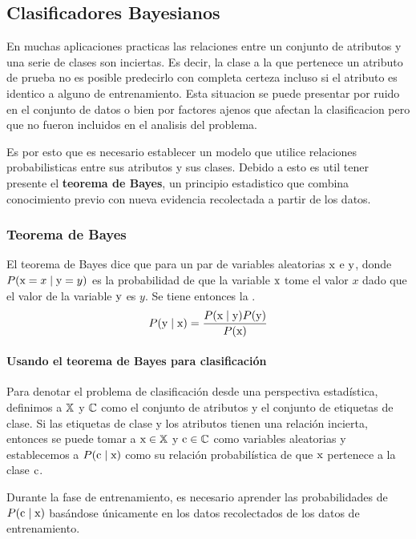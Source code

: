 
\subsection{Clasificadores Bayesianos} \label{sec:bayes}
En muchas aplicaciones practicas las relaciones entre un conjunto de atributos y una serie de clases son inciertas. Es decir, la clase a la que pertenece un atributo de prueba no es posible predecirlo con completa certeza incluso si el atributo es identico a alguno de entrenamiento. Esta situacion se puede presentar por ruido en el conjunto de datos o bien por factores ajenos que afectan la clasificacion pero que no fueron incluidos en el analisis del problema.

Es por esto que es necesario establecer un modelo que utilice relaciones probabilisticas entre sus atributos y sus clases. Debido a esto es util tener presente el \textbf{teorema de Bayes}, un principio estadistico que combina conocimiento previo con nueva evidencia recolectada a partir de los datos.

\subsubsection{Teorema de Bayes} \label{subsec:bayestheo}
El teorema de Bayes dice que para un par de variables aleatorias ${\textnormal{x}}$ e ${\textnormal{y}}$, donde $P({\textnormal{x}}=x \mid {\textnormal{y}}=y)$ es la probabilidad de que la variable ${\textnormal{x}}$ tome el valor $x$ dado que el valor de la variable ${\textnormal{y}}$ es $y$. Se tiene entonces la .
\begin{equation} \label{eq:bayestheo}
  P({\textnormal{y}} \mid {\textnormal{x}}) = \frac{P({\textnormal{x}} \mid {\textnormal{y}}) P({\textnormal{y}})}{P({\textnormal{x}})}
\end{equation}

\paragraph{Usando el teorema de Bayes para clasificación}
Para denotar el problema de clasificación desde una perspectiva estadística, definimos a ${\mathbb{X}}$ y ${\mathbb{C}}$ como el conjunto de atributos y el conjunto de etiquetas de clase. Si las etiquetas de clase y los atributos tienen una relación incierta, entonces se puede tomar a ${\textnormal{x}} \in {\mathbb{X}}$ y ${\textnormal{c}} \in {\mathbb{C}}$ como variables aleatorias y establecemos a $P({\textnormal{c}} \mid {\textnormal{x}})$ como su relación probabilística de que ${\textnormal{x}}$ pertenece a la clase ${\textnormal{c}}$.

Durante la fase de entrenamiento, es necesario aprender las probabilidades de $P({\textnormal{c}} \mid {\textnormal{x}})$ basándose únicamente en los datos recolectados de los datos de entrenamiento.

